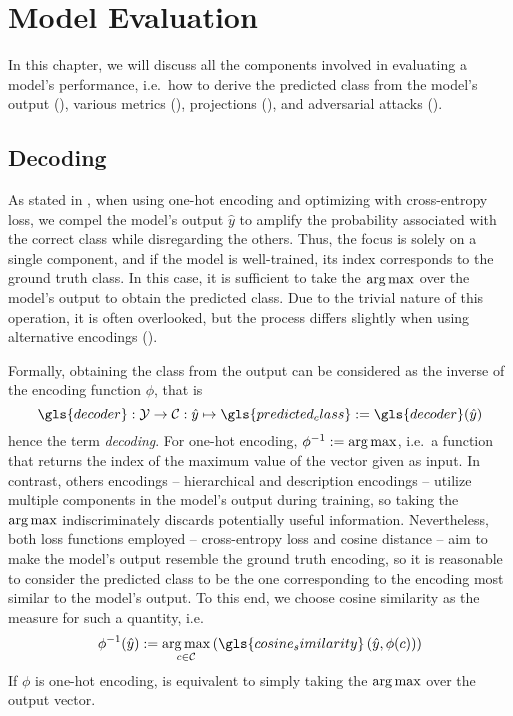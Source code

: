 \chapter{Model Evaluation}
\label{ch:model-evaluation}

In this chapter, we will discuss all the components involved in evaluating a model's performance, i.e.\ how to derive the predicted class from the model's output (), various metrics (), projections (), and adversarial attacks ().

\section{Decoding}
\label{sec:decoding}

As stated in , when using one-hot encoding and optimizing with cross-entropy loss, we compel the model's output $\hat{y}$ to amplify the probability associated with the correct class while disregarding the others. Thus, the focus is solely on a single component, and if the model is well-trained, its index corresponds to the ground truth class. In this case, it is sufficient to take the $\operatorname*{arg\,max}$ over the model's output to obtain the predicted class.
Due to the trivial nature of this operation, it is often overlooked, but the process differs slightly when using alternative encodings ().\medskip

Formally, obtaining the class from the output can be considered as the inverse of the encoding function $\phi$, that is
\begin{equation}
  \gls{decoder} : \mathcal{Y} \to \mathcal{C}
  : \hat{y} \mapsto \gls{predicted_class} := \gls{decoder}(\hat{y})
  \label{eq:decoding}
\end{equation}
hence the term \emph{decoding}.
For one-hot encoding, $\phi^{-1} := \operatorname*{arg\,max}$, i.e.\ a function that returns the index of the maximum value of the vector given as input. In contrast, others encodings -- hierarchical and description encodings -- utilize multiple components in the model's output during training, so taking the $\operatorname*{arg\,max}$ indiscriminately discards potentially useful information. Nevertheless, both loss functions employed -- cross-entropy loss and cosine distance -- aim to make the model's output resemble the ground truth encoding, so it is reasonable to consider the predicted class to be the one corresponding to the encoding most similar to the model's output.
To this end, we choose cosine similarity as the measure for such a quantity, i.e.\
\begin{equation}
  \phi^{-1}(\hat{y}) := \argmax_{c \in \mathcal{C}}
  \left( \gls{cosine_similarity} \left(\hat{y}, \phi(c) \right) \right)
  \label{eq:decoding-cos-sim}
\end{equation}
If $\phi$ is one-hot encoding,  is equivalent to simply taking the $\operatorname*{arg\,max}$ over the output vector.

